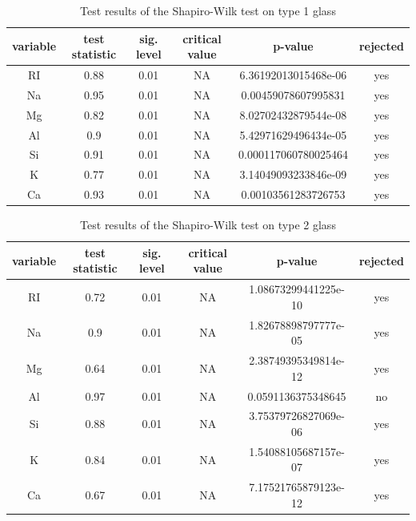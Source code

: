 \documentclass[a4paper, 12pt, titlepage, headsepline, listof = totoc, bibliography = totoc, numbers = noenddot]{scrartcl}
\begin{document}
\begin{table}[h!]
\centering
\begin{tabular}{|cccccc|} \hline variable & test statistic & sig. level & critical value & p-value & rejected\\ \hline RI & 0.88 & 0.01 & NA & 6.36192013015468e-06 & yes\\ 
Na & 0.95 & 0.01 & NA & 0.00459078607995831 & yes\\ 
Mg & 0.82 & 0.01 & NA & 8.02702432879544e-08 & yes\\ 
Al & 0.9 & 0.01 & NA & 5.42971629496434e-05 & yes\\ 
Si & 0.91 & 0.01 & NA & 0.000117060780025464 & yes\\ 
K & 0.77 & 0.01 & NA & 3.14049093233846e-09 & yes\\ 
Ca & 0.93 & 0.01 & NA & 0.00103561283726753 & yes\\ \hline \end{tabular}\caption{Test results of the Shapiro-Wilk test on type 1 glass}
\label{tab:testrestype1SW}
\end{table}

\begin{table}[h!]
\centering
\begin{tabular}{|cccccc|} \hline variable & test statistic & sig. level & critical value & p-value & rejected\\ \hline RI & 0.72 & 0.01 & NA & 1.08673299441225e-10 & yes\\ 
Na & 0.9 & 0.01 & NA & 1.82678898797777e-05 & yes\\ 
Mg & 0.64 & 0.01 & NA & 2.38749395349814e-12 & yes\\ 
Al & 0.97 & 0.01 & NA & 0.0591136375348645 & no\\ 
Si & 0.88 & 0.01 & NA & 3.75379726827069e-06 & yes\\ 
K & 0.84 & 0.01 & NA & 1.54088105687157e-07 & yes\\ 
Ca & 0.67 & 0.01 & NA & 7.17521765879123e-12 & yes\\ \hline \end{tabular}\caption{Test results of the Shapiro-Wilk test on type 2 glass}
\label{tab:testrestype2SW}
\end{table}
\end{document}
